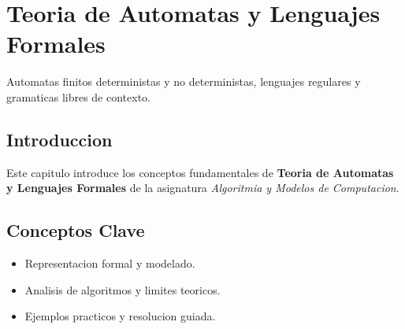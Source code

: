 \chapter{Teoria de Automatas y Lenguajes Formales}
\label{ch:automatas}

Automatas finitos deterministas y no deterministas, lenguajes regulares y gramaticas libres de contexto.

\section{Introduccion}
Este capitulo introduce los conceptos fundamentales de \textbf{Teoria de Automatas y Lenguajes Formales} de la asignatura \textit{Algoritmia y Modelos de Computacion}.

\section{Conceptos Clave}
\begin{itemize}
    \item Representacion formal y modelado.
    \item Analisis de algoritmos y limites teoricos.
    \item Ejemplos practicos y resolucion guiada.
\end{itemize}
